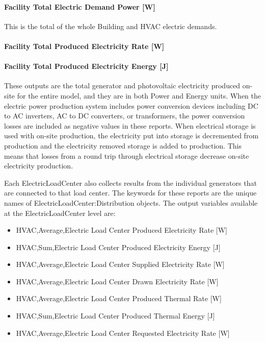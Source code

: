 \paragraph{Facility Total Electric Demand Power {[}W{]}}\label{facility-total-electric-demand-power-w}

This is the total of the whole Building and HVAC electric demands.

\paragraph{Facility Total Produced Electricity Rate {[}W{]}}\label{facility-total-produced-electric-power-w}

\paragraph{Facility Total Produced Electricity Energy {[}J{]}}\label{facility-total-produced-electric-energy-j}

These outputs are the total generator and photovoltaic electricity produced on-site for the entire model, and they are in both Power and Energy units. When the electric power production system includes power conversion devices including DC to AC inverters, AC to DC converters, or transformers, the power conversion losses are included as negative values in these reports. When electrical storage is used with on-site production, the electricity put into storage is decremented from production and the electricity removed storage is added to production. This means that losses from a round trip through electrical storage decrease on-site electricity production.

Each ElectricLoadCenter also collects results from the individual generators that are connected to that load center. The keywords for these reports are the unique names of ElectricLoadCenter:Distribution objects. The output variables available at the ElectricLoadCenter level are:

\begin{itemize}
\tightlist
\item
  HVAC,Average,Electric Load Center Produced Electricity Rate {[}W{]}
\item
  HVAC,Sum,Electric Load Center Produced Electricity Energy {[}J{]}
\item
  HVAC,Average,Electric Load Center Supplied Electricity Rate {[}W{]}
\item
  HVAC,Average,Electric Load Center Drawn Electricity Rate {[}W{]}
\item
  HVAC,Average,Electric Load Center Produced Thermal Rate {[}W{]}
\item
  HVAC,Sum,Electric Load Center Produced Thermal Energy {[}J{]}
\item
  HVAC,Average,Electric Load Center Requested Electricity Rate {[}W{]}
\end{itemize}

